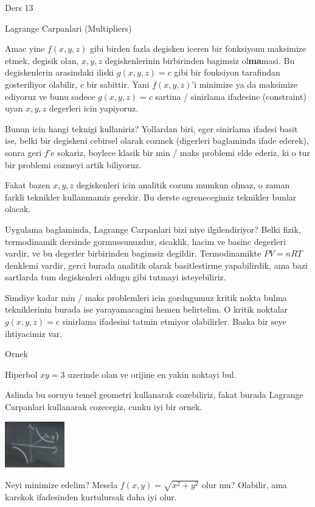 \documentclass[12pt,fleqn]{article}
\begin{document}
Ders 13

Lagrange Carpanlari (Multipliers)

Amac yine $f(x,y,z)$ gibi birden fazla degisken iceren bir fonksiyonu
maksimize etmek, degisik olan, $x,y,z$ degiskenlerinin birbirinden bagimsiz
ol\textbf{ma}masi. Bu degiskenlerin arasindaki iliski $g(x,y,z)=c$ gibi bir
fonksiyon tarafindan gosteriliyor olabilir, $c$ bir sabittir. Yani
$f(x,y,z)$'i minimize ya da maksimize ediyoruz ve bunu sadece $g(x,y,z)=c$
sartina / sinirlama ifadesine (constraint) uyan $x,y,z$ degerleri icin
yapiyoruz.

Bunun icin hangi teknigi kullaniriz? Yollardan biri, eger sinirlama ifadesi
basit ise, belki bir degiskeni cebirsel olarak cozmek (digerleri
baglaminda ifade ederek), sonra geri $f$'e sokariz, boylece klasik bir min
/ maks problemi elde ederiz, ki o tur bir problemi cozmeyi artik biliyoruz.

Fakat bazen $x,y,z$ degiskenleri icin analitik cozum mumkun olmaz, o zaman
farkli teknikler kullanmamiz gerekir. Bu derste ogrenecegimiz teknikler
bunlar olacak. 

Uygulama baglaminda, Lagrange Carpanlari bizi niye ilgilendiriyor? Belki
fizik, termodinamik dersinde gormussunuzdur, sicaklik, hacim ve basinc
degerleri vardir, ve bu degerler birbirinden bagimsiz
degildir. Termodinamikte $PV=nRT$ denklemi vardir, gerci burada analitik
olarak basitlestirme yapabilirdik, ama bazi sartlarda tum degiskenleri
oldugu gibi tutmayi isteyebiliriz. 

Simdiye kadar min / maks problemleri icin gordugumuz kritik nokta bulma
tekniklerinin burada ise yarayamacagini hemen belirtelim. O kritik noktalar
$g(x,y,z)=c$ sinirlama ifadesini tatmin etmiyor olabilirler. Baska bir seye
ihtiyacimiz var. 

Ornek

Hiperbol $xy =3$ uzerinde olan ve orijine en yakin noktayi bul. 

Aslinda bu soruyu temel geometri kullanarak cozebiliriz, fakat burada
Lagrange Carpanlari kullanarak cozecegiz, cunku iyi bir ornek. 

\includegraphics[height=2cm]{13_1.png}

Neyi minimize edelim? Mesela $f(x,y) = \sqrt{x^2 + y^2}$ olur mu? Olabilir,
ama karekok ifadesinden kurtulursak daha iyi olur. 
\end{document}
